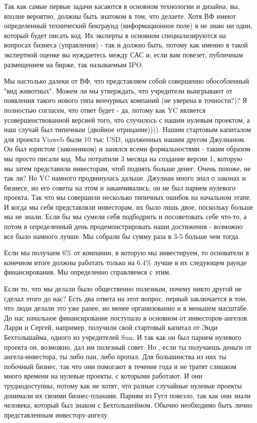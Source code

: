 \documentclass[ebook,12pt,oneside,openany]{memoir}
\begin{document}
Так как самые первые задачи касаются в основном технологии и дизайна,
вы, вполне вероятно, должны быть знатоком в том, что делаете. Хотя ВФ
имеют определенный технический бекграунд (информационное поле) я не
знаю ни один, который будет писать код. Их эксперты в основном
специализируются на вопросах бизнеса (управления) - так и должно быть,
потому как именно в такой экспертной оценке вы нуждаетесь между САС и,
если вам повезет, публичным размещением на бирже, так называемым IPO.

Мы настолько далеки от ВФ, что представляем собой совершенно
обособленный "вид животных". Можем ли мы утверждать, что учредители
выигрывают от появления такого нового типа венчурных компаний (не
уверена в точности?)? Я полностью согласен, что ответ будет - да,
потому как YC является усовершенствованной версией того, что случилось
с нашим нулевым проектом, а наш случай был типичным (двойное
отрицание)))). Нашим стартовым капиталом для проекта Viaweb были 10
тыс USD, одолженных нашим другом Джулианом. Он был юристом
(законником) и занялся всеми формальностями - таким образом мы просто
писали код. Мы потратили 3 месяца на создание версии 1, которую мы
затем представили инвесторам, чтоб поднять больше денег. Очень похоже,
не так ли? Но YC намного продвинулась дальше. Джулиан много знал о
законах и бизнесе, но его советы на этом и заканчивались; он не был
парнем нулевого проекта. Так что мы совершили несколько типичных
ошибок на начальном этапе. И когда мы себя представляли инвесторам, их
было лишь двое, поскольку больше мы не знали. Если бы мы сумели себя
подбодрить и посоветовать себе что-то, а потом в определенный день
продемонстрировать наши достижения - возможно все было намного лучше.
Мы собрали бы сумму раза в 3-5 больше чем тогда.

Если мы получаем 6\% от компании, в которую мы инвестируем, то
основатели в конечном итоге должны работать только на 6.4\% лучше в их
следующем раунде финансирования. Мы определенно справляемся с этим.

Если то, что мы делали было общественно полезным, почему никто другой
не сделал этого до нас? Есть два ответа на этот вопрос. первый
заключается в том, что люди делали это уже ранее, но менее
организованно и в меньшем масштабе. До нас начальное финансирование
поступало в основном от инвесторов-ангелов. Ларри и Сергей, например,
получили свой стартовый капитал от Энди Бехтольшайма, одного из
учредителей Sun. И так как он был парнем нулевого проекта он,
возможно, дал им полезный совет. Но , если ты получаешь деньги от
ангела-инвестора, ты либо пан, либо пропал. Для большинства из них ты
побочный бизнес, так что они помогают в течение года и не тратят
слишком много времени на нулевые проекты, с которыми работают. И они
труднодоступны, потому как не хотят, что разные случайные нулевые
проекты донимали их своими бизнес-планами. Парням из Гугл повезло, так
как они знали человека, который был знаком с Бехтольшеймом. Обычно
необходимо быть лично представленным инвестору-ангелу
\end{document}
